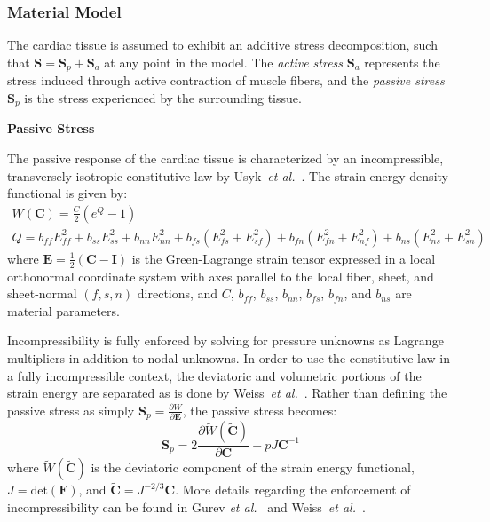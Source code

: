 \subsubsection{Material Model}
\label{Material Model}

The cardiac tissue is assumed to exhibit an additive stress decomposition, such that $\bm{S} = \bm{S}_p + \bm{S}_a$ at any point in the model. The \textit{active stress} $\bm{S}_a$ represents the stress induced through active contraction of muscle fibers, and the \textit{passive stress} $\bm{S}_p$ is the stress experienced by the surrounding tissue.

\textbf{Passive Stress}

The passive response of the cardiac tissue is characterized by an incompressible, transversely isotropic constitutive law by Usyk~\textit{et al.}~\cite{usyk_2002}. The strain energy density functional is given by:
\begin{gather}
W(\bm{C}) = \frac{C}{2}\left(e^Q -1\right) \\
Q = b_{ff} E^2_{ff} + b_{ss} E^2_{ss} + b_{nn} E^2_{nn} + b_{fs}\left(E^2_{fs} + E^2_{sf}\right) + b_{fn}\left(E^2_{fn} + E^2_{nf}\right) + b_{ns}\left(E^2_{ns} + E^2_{sn}\right)
\label{eqn:usyk}
\end{gather}
where $\bm{E} = \frac{1}{2}(\bm{C} - \bm{I})$ is the Green-Lagrange strain tensor expressed in a local orthonormal coordinate system with axes parallel to the local fiber, sheet, and sheet-normal $(f,s,n)$ directions, and $C$, $b_{ff}$, $b_{ss}$, $b_{nn}$, $b_{fs}$, $b_{fn}$, and $b_{ns}$ are material parameters.

Incompressibility is fully enforced by solving for pressure unknowns as Lagrange multipliers in addition to nodal unknowns. In order to use the constitutive law in a fully incompressible context, the deviatoric and volumetric portions of the strain energy are separated as is done by Weiss~\textit{et al.}~\cite{weiss_1996}. Rather than defining the passive stress as simply $\bm{S}_p = \frac{\partial W}{\partial \bm{E}}$, the passive stress becomes:
\begin{equation}
\bm{S}_p= 2\frac{\partial{\tilde{W}(\tilde{\bm{C}})}}{\partial{\bm{C}}} - pJ\bm{C}^{-1}
\end{equation}
where $\tilde{W}(\tilde{\bm{C}})$ is the deviatoric component of the strain energy functional, $J = \text{det}(\bm{F})$, and $\tilde{\bm{C}} = J^{-2/3}\bm{C}$. More details regarding the enforcement of incompressibility can be found in Gurev \textit{et al.}~\cite{gurev_2015} and Weiss~\textit{et al.}~\cite{weiss_1996}.

